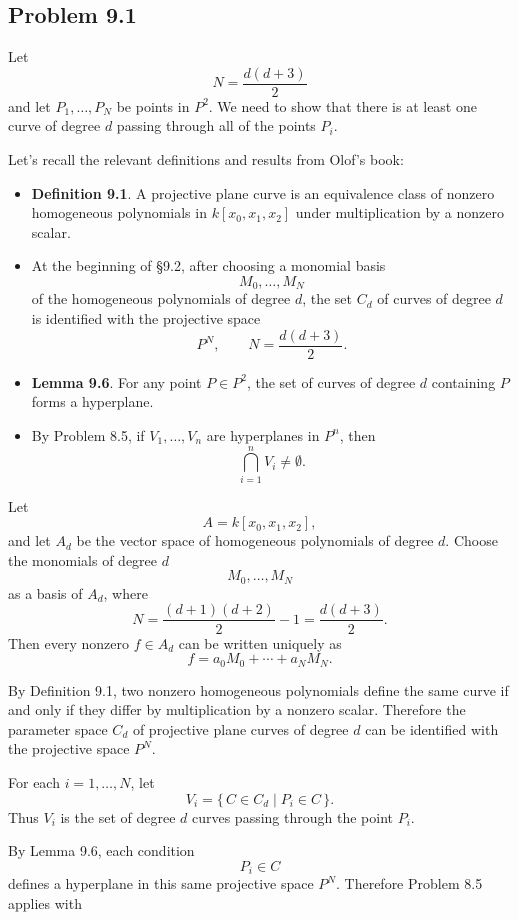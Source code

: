 \documentclass[a4paper,12pt]{article}
\theoremstyle{plain}
\theoremstyle{definition}
\theoremstyle{remark}
\begin{document}
\subsection*{Problem 9.1}

Let
\[
N=\frac{d(d+3)}{2}
\]
and let $P_1,\dots,P_N$ be points in $P^2$. We need to show that there is at least one curve of degree $d$ passing through all of the points $P_i$.

\medskip

Let's recall the relevant definitions and results from Olof's book:
\begin{itemize}
\item \textbf{Definition 9.1}. A projective plane curve is an equivalence class of nonzero homogeneous polynomials in $k[x_0,x_1,x_2]$ under multiplication by a nonzero scalar.

\item At the beginning of \S 9.2, after choosing a monomial basis
\[
M_0,\dots,M_N
\]
of the homogeneous polynomials of degree $d$, the set $C_d$ of curves of degree $d$ is identified with the projective space
\[
P^N,
\qquad
N=\frac{d(d+3)}{2}.
\]

\item \textbf{Lemma 9.6}. For any point $P\in P^2$, the set of curves of degree $d$ containing $P$ forms a hyperplane.

\item By Problem 8.5, if $V_1,\dots,V_n$ are hyperplanes in $P^n$, then
\[
\bigcap_{i=1}^n V_i\neq \emptyset.
\]
\end{itemize}

\medskip

Let
\[
A=k[x_0,x_1,x_2],
\]
and let $A_d$ be the vector space of homogeneous polynomials of degree $d$.
Choose the monomials of degree $d$
\[
M_0,\dots,M_N
\]
as a basis of $A_d$, where
\[
N=\frac{(d+1)(d+2)}{2}-1=\frac{d(d+3)}{2}.
\]
Then every nonzero $f\in A_d$ can be written uniquely as
\[
f=a_0M_0+\cdots+a_NM_N.
\]

By Definition 9.1, two nonzero homogeneous polynomials define the same curve if and only if they differ by multiplication by a nonzero scalar. Therefore the parameter space $C_d$ of projective plane curves of degree $d$ can be identified with the projective space
$P^N.$

For each $i=1,\dots,N$, let
\[
V_i=\{\, C\in C_d \mid P_i\in C \,\}.
\]
Thus $V_i$ is the set of degree $d$ curves passing through the point $P_i$.

By Lemma 9.6, each condition
\[
P_i\in C
\]
defines a hyperplane in this same projective space
$P^N.$
Therefore Problem 8.5 applies with
\end{document}
